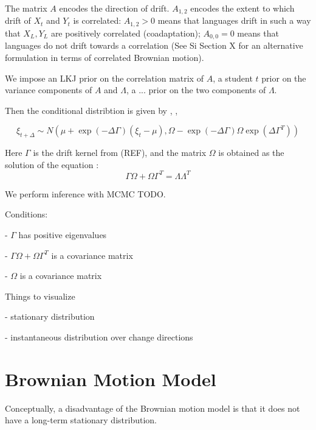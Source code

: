 \documentclass[11pt,a4paper]{article}
\begin{document}
The matrix $A$ encodes the direction of drift.
$A_{1,2}$ encodes the extent to which drift of $X_t$ and $Y_t$ is correlated:
$A_{1,2} > 0$ means that languages drift in such a way that $X_L, Y_L$ are positively correlated (coadaptation); $A_{0,0} = 0$ means that languages do not drift towards a correlation (See Si Section X for an alternative formulation in terms of correlated Brownian motion).

We impose an LKJ prior on the correlation matrix of $A$, a student $t$ prior on the variance components of $A$ and $\Lambda$, a ... prior on the two components of $\Lambda$.

Then the conditional distribtion is given by \citep[Theorem 3.3]{schach1971weak}, \citep{gardiner1983handbook}, \citep[p. 156, eq. 6.124]{risken1989fokker}

\begin{equation}
\xi_{t+\Delta} \sim N\left(\mu + \exp(-\Delta \Gamma) (\xi_t-\mu), \Omega - \exp(-\Delta \Gamma) \Omega \exp(\Delta \Gamma^T) \right)
\end{equation}

Here $\Gamma$ is the drift kernel from (REF), and the matrix $\Omega$ is obtained as the solution of the equation \citep[p. 110, eq. 4.4.51]{gardiner1983handbook} \citep[p. 156, eq. 6.126]{risken1989fokker}:
\begin{equation}
    \Gamma\Omega+\Omega\Gamma^T = \Lambda \Lambda^T
\end{equation}

We perform inference with MCMC TODO.



Conditions:

- $\Gamma$ has positive eigenvalues

- $\Gamma\Omega+\Omega\Gamma^T$ is a covariance matrix

- $\Omega$ is a covariance matrix

Things to visualize

- stationary distribution

- instantaneous distribution over change directions


\section{Brownian Motion Model}

Conceptually, a disadvantage of the Brownian motion model is that it does not have a long-term stationary distribution.
\end{document}
